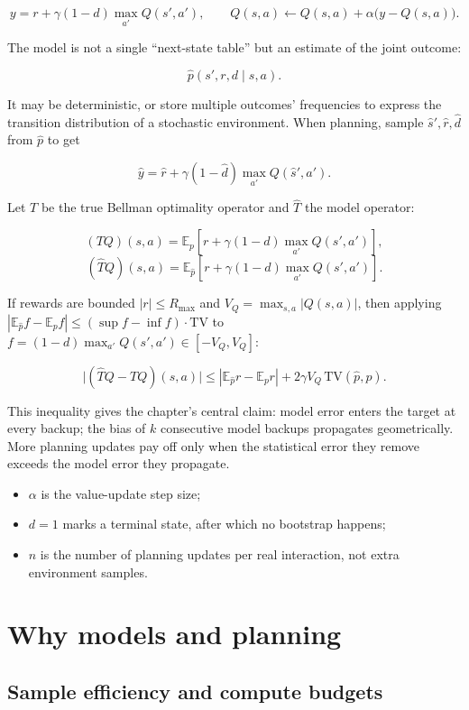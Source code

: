 \documentclass{article}
\begin{document}
\[
 y=r+\gamma(1-d)\max_{a'}Q(s',a'),\qquad
 Q(s,a)\leftarrow Q(s,a)+\alpha\bigl(y-Q(s,a)\bigr).
\]

The model is not a single ``next-state table'' but an estimate of the joint outcome:

\[
\boxed{\hat p(s',r,d\mid s,a)}.
\]

It may be deterministic, or store multiple outcomes' frequencies to express the transition distribution of a stochastic environment. When planning, sample $\hat s',\hat r,\hat d$ from $\hat p$ to get

\[
\hat y=\hat r+\gamma(1-\hat d)\max_{a'}Q(\hat s',a').
\]

Let $T$ be the true Bellman optimality operator and $\hat T$ the model operator:

\[
(TQ)(s,a)=\mathbb E_p[r+\gamma(1-d)\max_{a'}Q(s',a')],
\]
\[
(\hat TQ)(s,a)=\mathbb E_{\hat p}[r+\gamma(1-d)\max_{a'}Q(s',a')].
\]

If rewards are bounded $|r|\le R_{\max}$ and $V_Q=\max_{s,a}|Q(s,a)|$, then applying $|\mathbb E_{\hat p}f-\mathbb E_pf|\le(\sup f-\inf f)\cdot\mathrm{TV}$ to $f=(1-d)\max_{a'}Q(s',a')\in[-V_Q,V_Q]$:

\[
\bigl|(\hat TQ-TQ)(s,a)\bigr|
\le |\mathbb E_{\hat p}r-\mathbb E_pr|
+2\gamma V_Q\,\mathrm{TV}\!\left(\hat p,p\right).
\]

This inequality gives the chapter's central claim: model error enters the target at every backup; the bias of $k$ consecutive model backups propagates geometrically. More planning updates pay off only when the statistical error they remove exceeds the model error they propagate.

\begin{itemize}
  \item $\alpha$ is the value-update step size;
  \item $d=1$ marks a terminal state, after which no bootstrap happens;
  \item $n$ is the number of planning updates per real interaction, not extra environment samples.
\end{itemize}

\section*{Why models and planning}

\subsection*{Sample efficiency and compute budgets}
\end{document}
